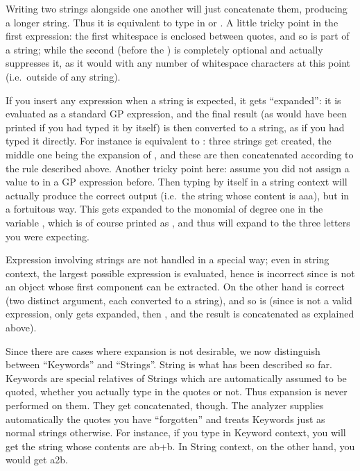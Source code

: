 \item Writing two strings alongside one another will just concatenate
them, producing a longer string. Thus it is equivalent to type in
 or . A little tricky point in the first expression:
the first whitespace is enclosed between quotes, and so is part of a string;
while the second (before the ) is completely optional and 
actually suppresses it, as it would with any number of whitespace characters
at this point (i.e.~outside of any string).

\item If you insert any expression when a string is expected, it gets
``expanded'': it is evaluated as a standard GP expression, and the final
result (as would have been printed if you had typed it by itself) is then
converted to a string, as if you had typed it directly. For instance  is equivalent to : three strings get created, the middle
one being the expansion of , and these are then concatenated
according to the rule described above. Another tricky point here: assume you
did not assign a value to  in a GP expression before. Then typing
 by itself in a string context will actually produce the correct
output (i.e.~the string whose content is aaa), but in a fortuitous way. This
 gets expanded to the monomial of degree one in the variable
, which is of course printed as , and thus will expand to
the three letters you were expecting.

 Expression involving strings are not handled in a
special way; even in string context, the largest possible expression is
evaluated, hence  is incorrect since  is not an
object whose first component can be extracted. On the other hand
 is correct (two distinct argument, each converted to a
string), and so is  (since  is not a valid
expression, only  gets expanded, then , and the result is
concatenated as explained above).

 Since there are cases where expansion is not desirable, we
now distinguish between ``Keywords'' and ``Strings''. String is what has been
described so far. Keywords are special relatives of Strings which are
automatically assumed to be quoted, whether you actually type in the quotes
or not. Thus expansion is never performed on them. They get concatenated,
though. The analyzer supplies automatically the quotes you have ``forgotten''
and treats Keywords just as normal strings otherwise. For instance, if you
type  in Keyword context, you will get the string whose contents
are ab+b. In String context, on the other hand, you would get a2\kbd{*}b.

